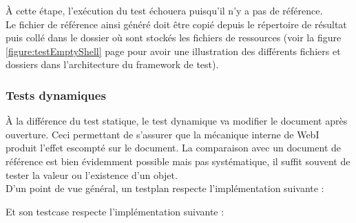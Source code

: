 \`{A} cette \'{e}tape, l'ex\'{e}cution du test \'{e}chouera puisqu'il n'y a pas de r\'{e}f\'{e}rence.\\
Le fichier de r\'{e}f\'{e}rence ainsi g\'{e}n\'{e}r\'{e} doit \^{e}tre copié depuis le r\'{e}pertoire de r\'{e}sultat puis coll\'{e} dans le dossier où sont stock\'{e}s les fichiers de ressources (voir la figure \ref{figure:testEmptyShell} page \pageref{figure:testEmptyShell} pour avoir une illustration des diff\'{e}rents fichiers et dossiers dans l'architecture du framework de test).







\subsubsection{Tests dynamiques}

\`{A} la diff\'{e}rence du test statique, le test dynamique va modifier le document apr\`{e}s ouverture. Ceci permettant de s'assurer que la m\'{e}canique interne de WebI produit l'effet escompt\'{e} sur le document. La comparaison avec un document de r\'{e}f\'{e}rence est bien \'{e}videmment possible mais pas syst\'{e}matique, il suffit souvent de tester la valeur ou l'existence d'un objet.\\
D'un point de vue g\'{e}n\'{e}ral, un testplan respecte l'impl\'{e}mentation suivante :





Et son testcase respecte l'impl\'{e}mentation suivante :



